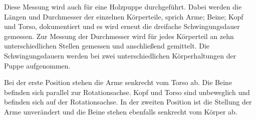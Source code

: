 Diese Messung wird auch für eine Holzpuppe durchgeführt. Dabei werden die Längen und Durchmesser der einzelnen Körperteile, sprich Arme; Beine; Kopf und Torso, dokumentiert und es wird erneut die dreifache Schwingungsdauer
gemessen. Zur Messung der Durchmesser wird für jedes Körperteil an zehn unterschiedlichen Stellen gemessen und anschließend gemittelt. Die Schwingungsdauern werden bei zwei unterschiedlichen Körperhaltungen der Puppe aufgenommen.

Bei der erste Position stehen die Arme senkrecht vom Torso ab. Die Beine befinden sich parallel zur Rotationsachse. Kopf und Torso sind unbeweglich und befinden sich auf der Rotationsachse.
In der zweiten Position ist die Stellung der Arme unverändert und die Beine stehen ebenfalls senkrecht vom Körper ab. 


